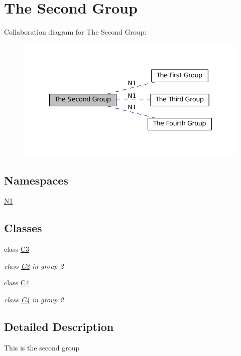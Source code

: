 \hypertarget{group__group2}{}\section{The Second Group}
\label{group__group2}
Collaboration diagram for The Second Group\+:
\nopagebreak
\begin{figure}[H]
\begin{center}
\leavevmode
\includegraphics[width=335pt]{group__group2}
\end{center}
\end{figure}
\subsection*{Namespaces}
\begin{DoxyCompactItemize}
\item 
 \hyperlink{namespaceN1}{N1}
\end{DoxyCompactItemize}
\subsection*{Classes}
\begin{DoxyCompactItemize}
\item 
class \hyperlink{classC3}{C3}
\begin{DoxyCompactList}\small\item\em class \hyperlink{classC3}{C3} in group 2 \end{DoxyCompactList}\item 
class \hyperlink{classC4}{C4}
\begin{DoxyCompactList}\small\item\em class \hyperlink{classC4}{C4} in group 2 \end{DoxyCompactList}\end{DoxyCompactItemize}


\subsection{Detailed Description}
This is the second group 